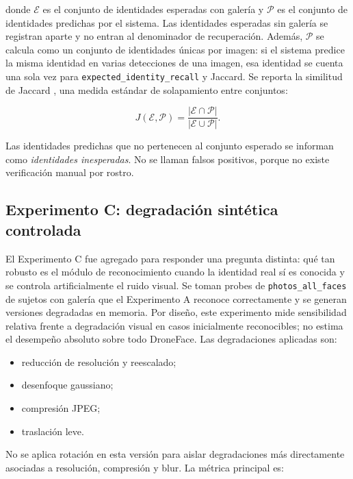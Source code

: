 \documentclass[11pt]{article}
\begin{document}
donde $\mathcal{E}$ es el conjunto de identidades esperadas con galería y $\mathcal{P}$ es el conjunto de identidades predichas por el sistema. Las identidades esperadas sin galería se registran aparte y no entran al denominador de recuperación. Además, $\mathcal{P}$ se calcula como un conjunto de identidades únicas por imagen: si el sistema predice la misma identidad en varias detecciones de una imagen, esa identidad se cuenta una sola vez para \texttt{expected\_identity\_recall} y Jaccard. Se reporta la similitud de Jaccard \cite{jaccard1901}, una medida estándar de solapamiento entre conjuntos:

\begin{equation}
    J(\mathcal{E}, \mathcal{P}) =
    \frac{|\mathcal{E} \cap \mathcal{P}|}{|\mathcal{E} \cup \mathcal{P}|}.
\end{equation}

Las identidades predichas que no pertenecen al conjunto esperado se informan como \textit{identidades inesperadas}. No se llaman falsos positivos, porque no existe verificación manual por rostro.

\subsection{Experimento C: degradación sintética controlada}

El Experimento C fue agregado para responder una pregunta distinta: qué tan robusto es el módulo de reconocimiento cuando la identidad real sí es conocida y se controla artificialmente el ruido visual. Se toman probes de \texttt{photos\_all\_faces} de sujetos con galería que el Experimento A reconoce correctamente y se generan versiones degradadas en memoria. Por diseño, este experimento mide sensibilidad relativa frente a degradación visual en casos inicialmente reconocibles; no estima el desempeño absoluto sobre todo DroneFace. Las degradaciones aplicadas son:

\begin{itemize}
    \item reducción de resolución y reescalado;
    \item desenfoque gaussiano;
    \item compresión JPEG;
    \item traslación leve.
\end{itemize}

No se aplica rotación en esta versión para aislar degradaciones más directamente asociadas a resolución, compresión y blur. La métrica principal es:
\end{document}
